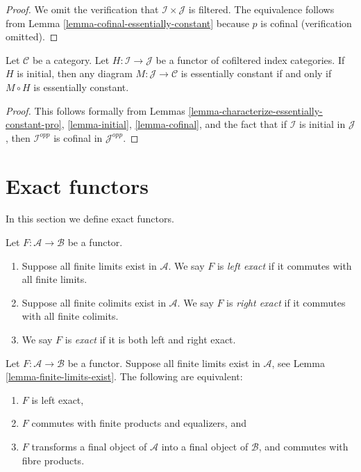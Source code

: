\begin{proof}
We omit the verification that $\mathcal{I} \times \mathcal{J}$ is
filtered. The equivalence follows from
Lemma \ref{lemma-cofinal-essentially-constant}
because $p$ is cofinal (verification omitted).
\end{proof}

\begin{lemma}
\label{lemma-initial-essentially-constant}
Let $\mathcal{C}$ be a category. Let $H : \mathcal{I} \to \mathcal{J}$
be a functor of cofiltered index categories. If $H$ is initial, then
any diagram $M : \mathcal{J} \to \mathcal{C}$ is essentially constant
if and only if $M \circ H$ is essentially constant.
\end{lemma}

\begin{proof}
This follows formally from
Lemmas \ref{lemma-characterize-essentially-constant-pro},
\ref{lemma-initial}, \ref{lemma-cofinal}, and
the fact that if $\mathcal{I}$ is initial in $\mathcal{J}$,
then $\mathcal{I}^{opp}$ is cofinal in $\mathcal{J}^{opp}$.
\end{proof}





\section{Exact functors}
\label{section-exact-functor}

\noindent
In this section we define exact functors.

\begin{definition}
\label{definition-exact}
Let $F : \mathcal{A} \to \mathcal{B}$ be a functor.
\begin{enumerate}
\item Suppose all finite limits exist in $\mathcal{A}$.
We say $F$ is {\it left exact} if it commutes
with all finite limits.
\item Suppose all finite colimits exist in $\mathcal{A}$.
We say $F$ is {\it right exact} if it commutes
with all finite colimits.
\item We say $F$ is {\it exact} if it is both left and right
exact.
\end{enumerate}
\end{definition}

\begin{lemma}
\label{lemma-characterize-left-exact}
Let $F : \mathcal{A} \to \mathcal{B}$ be a functor.
Suppose all finite limits exist in $\mathcal{A}$,
see Lemma \ref{lemma-finite-limits-exist}.
The following are equivalent:
\begin{enumerate}
\item $F$ is left exact,
\item $F$ commutes with finite products and equalizers, and
\item $F$ transforms a final object of $\mathcal{A}$
into a final object of $\mathcal{B}$, and commutes with fibre products.
\end{enumerate}
\end{lemma}

